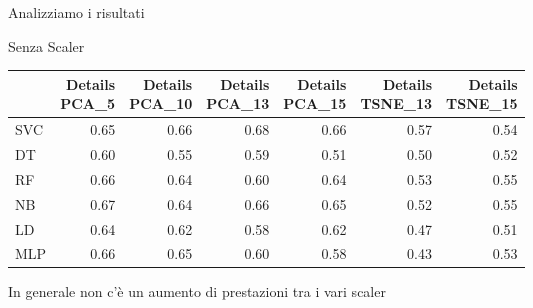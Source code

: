 \documentclass{beamer}
\begin{document}
\begin{frame}{Analizziamo i risultati}
	\begin{block}{Senza Scaler}
		\begin{center}
			\begin{adjustbox}{max width=\textwidth}
				\begin{tabular}{lrrrrrr}
					\toprule
					{} &  \thead{Details\\PCA\_5} &  \thead{Details\\PCA\_10} &  \thead{Details\\PCA\_13} &  \thead{Details\\PCA\_15} &  \thead{Details\\TSNE\_13} &  \thead{Details\\TSNE\_15} \\
					\midrule
					SVC &                  0.65 &                   0.66 &                   0.68 &                   0.66 &                    0.57 &                    0.54 \\
					DT  &                  0.60 &                   0.55 &                   0.59 &                   0.51 &                    0.50 &                    0.52 \\
					RF  &                  0.66 &                   0.64 &                   0.60 &                   0.64 &                    0.53 &                    0.55 \\
					NB  &                  0.67 &                   0.64 &                   0.66 &                   0.65 &                    0.52 &                    0.55 \\
					LD  &                  0.64 &                   0.62 &                   0.58 &                   0.62 &                    0.47 &                    0.51 \\
					MLP &                  0.66 &                   0.65 &                   0.60 &                   0.58 &                    0.43 &                    0.53 \\
					\bottomrule
				\end{tabular}
			\end{adjustbox}
		\end{center}
	In generale non c’è un aumento di prestazioni tra i vari scaler
	\end{block}
\end{frame}
\end{document}
